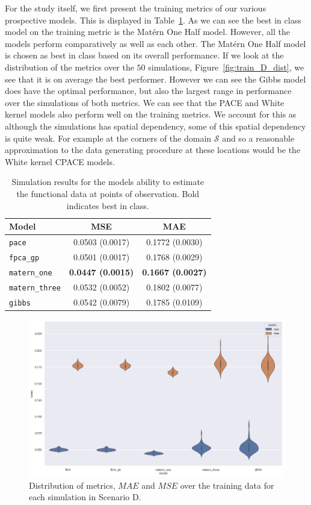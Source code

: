 For the study itself, we first present the training metrics of our various prospective models. 
This is displayed in Table~\ref{tab:train_D}.
As we can see the best in class model on the training metric is the Mat\'ern One Half model. 
However, all the models perform comparatively as well as each other.
The Mat\'ern One Half model is chosen as best in class based on its overall performance.
If we look at the distribution of the metrics over the $50$ simulations, Figure~\ref{fig:train_D_dist}, we see that it is on average the best performer. 
However we can see the Gibbs model  does have the optimal performance, but also the largest range in performance over the simulations of both metrics.
We can see that the PACE and White kernel models also perform well on the training metrics.
We account for this as although the simulations has spatial dependency, some of this spatial dependency is quite weak.
For example at the corners of the domain $\mathcal{S}$ and so a reasonable approximation to the data generating procedure at these locations would be the White kernel CPACE models.


\begin{table}[b]
	\caption[Simulation results for Scenario D on observed data]{Simulation results for the models ability to estimate the functional data at points of observation. Bold indicates best in class.}
	\centering
	\label{tab:train_D}
	\begin{tabular}{lcc}
		\toprule
		\textbf{Model} & \textbf{MSE} & \textbf{MAE} \\
		\midrule
		\verb*|pace| & 0.0503 (0.0017)& 0.1772 (0.0030)\\
		\verb*|fpca_gp| & 0.0501 (0.0017) & 0.1768	(0.0029) \\
		\verb*|matern_one| & \textbf{0.0447	(0.0015)} & \textbf{0.1667 (0.0027)} \\
		\verb*|matern_three| & 0.0532 (0.0052)& 0.1802 (0.0077) \\
		\verb*|gibbs| & 0.0542 (0.0079) & 0.1785 (0.0109)\\
		\bottomrule
	\end{tabular}
\end{table}

\begin{figure}
	\centering
	\includegraphics[width=\textwidth]{train_D_dist}
	\caption{Distribution of metrics, $MAE$ and $MSE$ over the training data for each simulation in Scenario D.}
	\label{fig:train_D_test}
\end{figure}

